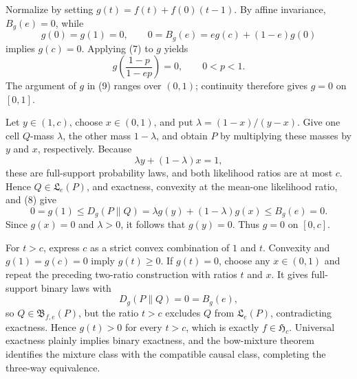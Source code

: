 Normalize by setting \(g(t)=f(t)+f(0)(t-1)\).  By affine invariance, \(B_g(e)=0\), while
\[
 g(0)=g(1)=0,
 \qquad
 0=B_g(e)=eg(c)+(1-e)g(0)
\]
implies \(g(c)=0\).  Applying (7) to \(g\) yields
\[
 g\!\left(\frac{1-p}{1-ep}\right)=0,\qquad 0<p<1. \tag{9}
\]
The argument of \(g\) in (9) ranges over \((0,1)\); continuity therefore gives \(g=0\) on \([0,1]\).

Let \(y\in(1,c)\), choose \(x\in(0,1)\), and put \(\lambda=(1-x)/(y-x)\).  Give one cell \(Q\)-mass \(\lambda\), the other mass \(1-\lambda\), and obtain \(P\) by multiplying these masses by \(y\) and \(x\), respectively.  Because
\[
 \lambda y+(1-\lambda)x=1,
\]
these are full-support probability laws, and both likelihood ratios are at most \(c\).  Hence \(Q\in\mathfrak L_e(P)\), and exactness, convexity at the mean-one likelihood ratio, and (8) give
\[
 0=g(1)\le D_g(P\|Q)
   =\lambda g(y)+(1-\lambda)g(x)\le B_g(e)=0.
\]
Since \(g(x)=0\) and \(\lambda>0\), it follows that \(g(y)=0\).  Thus \(g=0\) on \([0,c]\).

For \(t>c\), express \(c\) as a strict convex combination of \(1\) and \(t\).  Convexity and \(g(1)=g(c)=0\) imply \(g(t)\ge0\).  If \(g(t)=0\), choose any \(x\in(0,1)\) and repeat the preceding two-ratio construction with ratios \(t\) and \(x\).  It gives full-support binary laws with
\[
 D_g(P\|Q)=0=B_g(e),
\]
so \(Q\in\mathfrak B_{f,e}(P)\), but the ratio \(t>c\) excludes \(Q\) from \(\mathfrak L_e(P)\), contradicting exactness.  Hence \(g(t)>0\) for every \(t>c\), which is exactly \(f\in\mathfrak H_c\).  Universal exactness plainly implies binary exactness, and the bow-mixture theorem identifies the mixture class with the compatible causal class, completing the three-way equivalence.